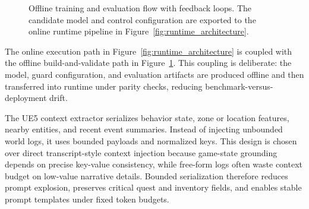 ﻿\documentclass[a4paper,12pt]{article}
\begin{document}
\begin{figure}[t]
\centering
{}
\caption{Offline training and evaluation flow with feedback loops. The candidate model and control configuration are exported to the online runtime pipeline in Figure~\ref{fig:runtime_architecture}.}
\label{fig:offline_pipeline}
\end{figure}

The online execution path in Figure~\ref{fig:runtime_architecture} is coupled with the offline build-and-validate path in Figure~\ref{fig:offline_pipeline}. This coupling is deliberate: the model, guard configuration, and evaluation artifacts are produced offline and then transferred into runtime under parity checks, reducing benchmark-versus-deployment drift.

The UE5 context extractor serializes behavior state, zone or location features, nearby entities, and recent event summaries. Instead of injecting unbounded world logs, it uses bounded payloads and normalized keys. This design is chosen over direct transcript-style context injection because game-state grounding depends on precise key-value consistency, while free-form logs often waste context budget on low-value narrative details. Bounded serialization therefore reduces prompt explosion, preserves critical quest and inventory fields, and enables stable prompt templates under fixed token budgets.
\end{document}
